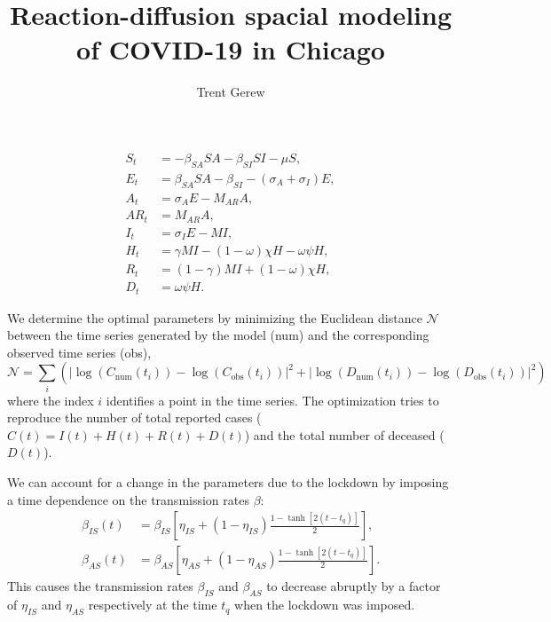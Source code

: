 \documentclass[10pt,letterpaper,draft]{article}
\author{Trent Gerew}
\title{Reaction-diffusion spacial modeling of COVID-19 in Chicago}
\newcommand{\N}{\mathcal{N}}
\newcommand{\num}{\text{num}}
\newcommand{\obs}{\text{obs}}
\begin{document}
	
	\begin{align}
		S_t &= - \beta_{SA} SA - \beta_{SI} SI - \mu S, \\
		E_t &= \beta_{SA} SA - \beta_{SI} - (\sigma_A + \sigma_I) E, \\
		A_t &= \sigma_A E - M_{AR} A, \\
		AR_t &= M_{AR} A, \\
		I_t &= \sigma_I E - MI, \\
		H_t &= \gamma M I - (1 - \omega) \chi H - \omega \psi H, \\
		R_t &= (1 - \gamma) M I + (1 - \omega) \chi H, \\
		D_t &= \omega \psi H.
	\end{align}
	
	We determine the optimal parameters by minimizing the Euclidean distance $\N$ between the time series generated by the model (num) and the corresponding observed time series (obs),
	\begin{equation}
		\N = \sum_i \left( \left| \log(C_{\num}(t_i)) - \log(C_{\obs}(t_i)) \right|^2
		+ \left| \log(D_{\num}(t_i)) - \log(D_{\obs}(t_i)) \right|^2 \right)
	\end{equation}
	where the index $i$ identifies a point in the time series.
	The optimization tries to reproduce the number of total reported cases ($C(t) = I(t) + H(t) + R(t) + D(t)$) and the total number of deceased ($D(t)$).
	
	We can account for a change in the parameters due to the lockdown by imposing a time dependence on the transmission rates $\beta$:
	\begin{align}
		\beta_{IS} (t) &= \beta_{IS} \left[ \eta_{IS} + (1 - \eta_{IS}) \frac{1 - \tanh[2(t - t_q)]}{2} \right], \\
		\beta_{AS} (t) &= \beta_{AS} \left[ \eta_{AS} + (1 - \eta_{AS}) \frac{1 - \tanh[2(t - t_q)]}{2} \right].
	\end{align}
	This causes the transmission rates $\beta_{IS}$ and $\beta_{AS}$ to decrease abruptly by a factor of $\eta_{IS}$ and $\eta_{AS}$ respectively at the time $t_q$ when the lockdown was imposed.
\end{document}
